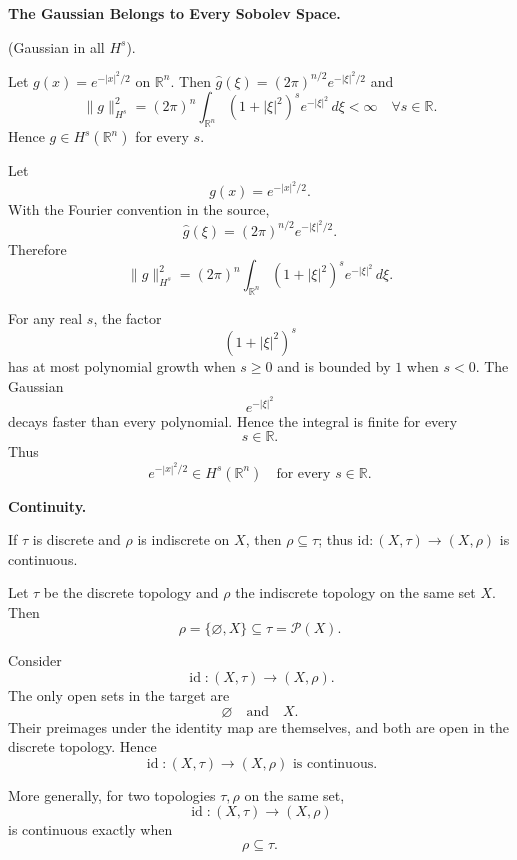 \begin{problem}[CP-II-0214]
\label{prob:cp-ii-0214}
\textbf{The Gaussian Belongs to Every Sobolev Space.}

\hspace*{1.5em}(Gaussian in all $H^s$).

Let $g(x)=e^{-|x|^2/2}$ on $\mathbb R^n$. Then
$\widehat g(\xi)=(2\pi)^{n/2}e^{-|\xi|^2/2}$ and
\[
\|g\|_{H^s}^2=(2\pi)^n\!\int_{\mathbb R^n}(1+|\xi|^2)^s e^{-|\xi|^2}\,d\xi<\infty
\quad\forall s\in\mathbb R.
\]
Hence $g\in H^s(\mathbb R^n)$ for every $s$.
\end{problem}

\begin{solution}
Let
\[
g(x)=e^{-|x|^2/2}.
\]
With the Fourier convention in the source,
\[
\widehat g(\xi)
=
(2\pi)^{n/2}e^{-|\xi|^2/2}.
\]
Therefore
\[
\|g\|_{H^s}^2
=
(2\pi)^n
\int_{\mathbb R^n}
(1+|\xi|^2)^s
e^{-|\xi|^2}\,d\xi.
\]

For any real \(s\), the factor
\[
(1+|\xi|^2)^s
\]
has at most polynomial growth when \(s\ge0\) and is bounded by \(1\) when \(s<0\). The
Gaussian
\[
e^{-|\xi|^2}
\]
decays faster than every polynomial. Hence the integral is finite for every
\[
s\in\mathbb R.
\]
Thus
\[
\boxed{
e^{-|x|^2/2}\in H^s(\mathbb R^n)
\quad\text{for every }s\in\mathbb R.
}
\]
\end{solution}


\begin{problem}[CP-II-0219]
\label{prob:cp-ii-0219}
\textbf{Continuity.}

\hspace*{1.5em}If $\tau$ is discrete and $\rho$ is indiscrete on $X$, then $\rho\subseteq\tau$; thus $\mathrm{id}:(X,\tau)\to(X,\rho)$ is continuous.
\end{problem}

\begin{solution}
Let \(\tau\) be the discrete topology and \(\rho\) the indiscrete topology on the same set
\(X\). Then
\[
\rho=\{\varnothing,X\}
\subseteq
\tau=\mathcal P(X).
\]

Consider
\[
\operatorname{id}:(X,\tau)\to(X,\rho).
\]
The only open sets in the target are
\[
\varnothing
\quad\text{and}\quad
X.
\]
Their preimages under the identity map are themselves, and both are open in the discrete
topology. Hence
\[
\boxed{
\operatorname{id}:(X,\tau)\to(X,\rho)
\text{ is continuous}.
}
\]

More generally, for two topologies \(\tau,\rho\) on the same set,
\[
\operatorname{id}:(X,\tau)\to(X,\rho)
\]
is continuous exactly when
\[
\rho\subseteq\tau.
\]
\end{solution}


